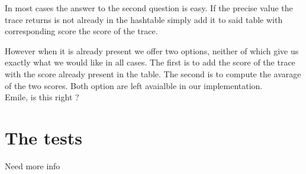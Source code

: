 \documentclass{article}
\newcommand\SC[1]{{\color{violet}{\it \bf Simon :} #1}}
\begin{document}
	In most cases the answer to the second question is easy. If the precise value the trace returns is not already in the hashtable simply add it to said table with corresponding score the score of the trace.

	However when it is already present we offer two options, neither of which give us exactly what we would like in all cases.
	The first is to add the score of the trace with the score already present in the table.
	The second is to compute the avarage of the two scores.
	Both option are left avaialble in our implementation. \\
	\SC{Emile, is this right ?}

\section{The tests}

\SC{Need more info}
\end{document}
